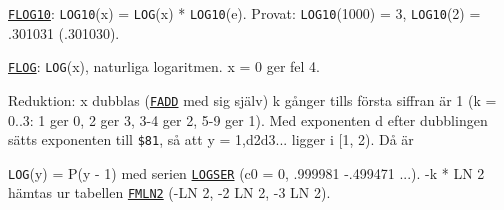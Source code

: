 \begin{Listing}
\Gap
\begin{Cmt}\par\noindent \hyperlink{l:FLOG10}{\texttt{FLOG10}}: \texttt{LOG10}(x) = \texttt{LOG}(x) * \texttt{LOG10}(e). Provat: \texttt{LOG10}(1000) = 3, \texttt{LOG10}(2) = .301031 (.301030).\par\end{Cmt}
\Gap
\begin{Cmt}\par\noindent \hyperlink{l:FLOG}{\texttt{FLOG}}: \texttt{LOG}(x), naturliga logaritmen. x {}= 0 ger fel 4.\par
\par\noindent Reduktion: x dubblas (\hyperlink{l:FADD}{\texttt{FADD}} med sig själv) k gånger tills första siffran är 1 (k = 0..3: 1 ger 0, 2 ger 3, 3\mbox{-}4 ger 2, 5\mbox{-}9 ger 1). Med exponenten d efter dubblingen sätts exponenten till \texttt{\$81}, så att y = 1,d2d3... ligger i [1, 2). Då är\par
\begin{Verb}
\end{Verb}
\par\noindent \texttt{LOG}(y) = P(y - 1) med serien \hyperlink{l:LOGSER}{\texttt{LOGSER}} (c0 = 0, .999981 -.499471 ...). -k * LN 2 hämtas ur tabellen \hyperlink{l:FMLN2}{\texttt{FMLN2}} (-LN 2, \mbox{-}2 LN 2, \mbox{-}3 LN 2).\par\end{Cmt}

\end{Listing}
